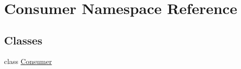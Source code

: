 \hypertarget{namespace_consumer}{}\section{Consumer Namespace Reference}
\label{namespace_consumer}
\subsection*{Classes}
\begin{DoxyCompactItemize}
\item 
class \hyperlink{class_consumer_1_1_consumer}{Consumer}
\end{DoxyCompactItemize}
